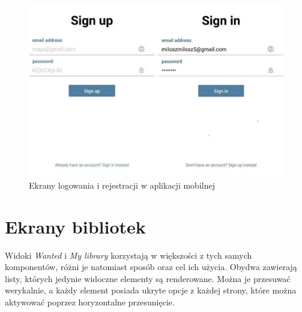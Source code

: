 \begin{figure}[H]
	\centering
	\includegraphics[width=\linewidth]{signin_signup.pdf}
	\caption{Ekrany logowania i rejestracji w aplikacji mobilnej}
\end{figure}
\section{Ekrany bibliotek}
Widoki \textit{Wanted} i \textit{My library} korzystają w większości z tych samych komponentów, różni je natomiast sposób oraz cel ich użycia. Obydwa zawierają listy, których jedynie widoczne elementy są renderowane. Można je przesuwać werykalnie, a każdy element posiada ukryte opcje z każdej strony, które można aktywować poprzez horyzontalne przesunięcie.


